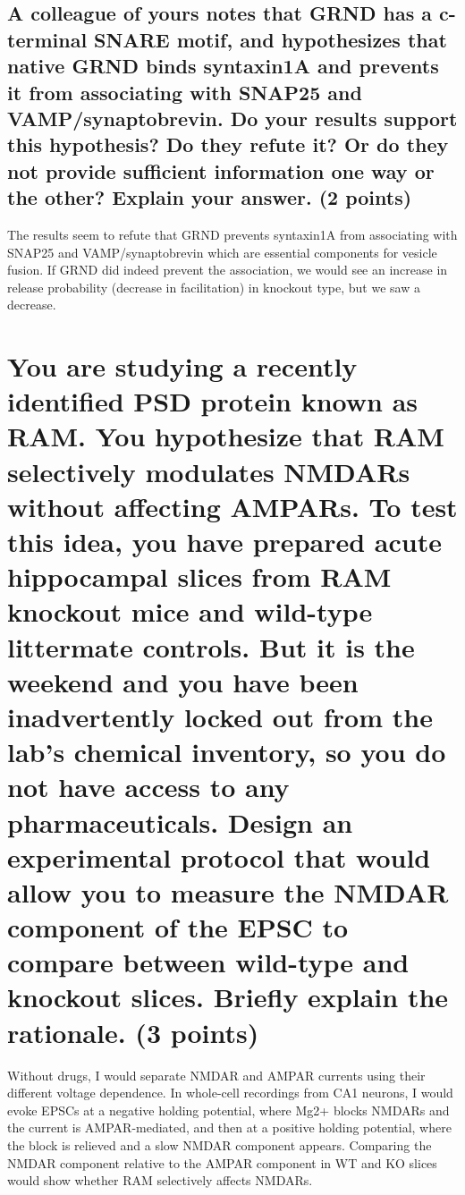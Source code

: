 \documentclass{article}
\begin{document}
\subsection{
    A colleague of yours notes that GRND has a c-terminal SNARE motif, and hypothesizes that
native GRND binds syntaxin1A and prevents it from associating with SNAP25 and
VAMP/synaptobrevin. Do your results support this hypothesis? Do they refute it? Or do they
not provide sufficient information one way or the other? Explain your answer. (2 points)
}
The results seem to refute that GRND prevents syntaxin1A from associating with
SNAP25 and VAMP/synaptobrevin which are essential components for vesicle fusion.
If GRND did indeed prevent the association, we would see an increase in release probability
(decrease in facilitation) in knockout type, but we saw a decrease.

\section{
    You are studying a recently identified PSD protein known as RAM. You
hypothesize that RAM selectively modulates NMDARs without affecting AMPARs. To test this
idea, you have prepared acute hippocampal slices from RAM knockout mice and wild-type
littermate controls. But it is the weekend and you have been inadvertently locked out from the
lab’s chemical inventory, so you do not have access to any pharmaceuticals. Design an
experimental protocol that would allow you to measure the NMDAR component of the EPSC to
compare between wild-type and knockout slices. Briefly explain the rationale. (3 points)
}
Without drugs, I would separate NMDAR and AMPAR currents using their different voltage dependence. In whole-cell recordings from CA1 neurons, I would evoke EPSCs at a negative holding potential, where Mg2+ blocks NMDARs and the current is AMPAR-mediated, and then at a positive holding potential, where the block is relieved and a slow NMDAR component appears. Comparing the NMDAR component relative to the AMPAR component in WT and KO slices would show whether RAM selectively affects NMDARs.
\end{document}
